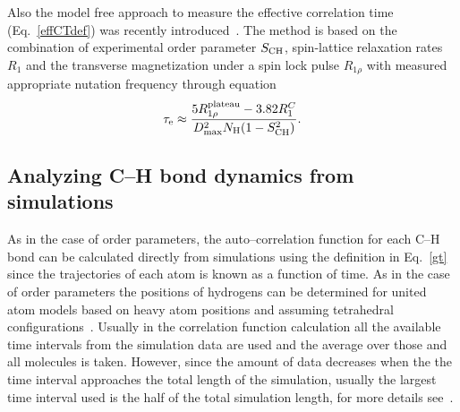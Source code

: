 \documentclass[aps,prl,superscriptaddress,twocolumn]{revtex4}
\begin{document}
Also the model free approach to measure the effective correlation time (Eq.~\ref{effCTdef}) was recently
introduced~\cite{ferreira15}. The method is based on the combination of experimental order parameter $S_{{\rm CH}}$,
spin-lattice relaxation rates $R_1$ and the transverse magnetization under a spin lock pulse $R_{1\rho}$ with measured 
appropriate nutation frequency through equation
\begin{equation}\label{ECT}
\tau_{\rm{e}}\approx\frac{5R_{1\rho}^{\rm{plateau}}-3.82R_1^C}{D_{\rm{max}}^2N_{\rm{H}}(1-S_{\rm{CH}}^2)}.
\end{equation} 



\subsection{Analyzing C--H bond dynamics from simulations}

As in the case of order parameters, the auto--correlation function for each C--H bond can be
calculated directly from simulations using the definition in Eq.~\ref{gt} since the trajectories of each atom is known
as a function of time. As in the case of order parameters the positions of hydrogens can be determined 
for united atom models based on heavy atom positions and assuming tetrahedral configurations~\cite{lindahl01,wohlert06,ferreira15}.
Usually in the correlation function calculation all the available time intervals from the 
simulation data are used and the average over those and all molecules is taken. However, since the 
amount of data decreases when the the time interval approaches the total length of the simulation,
usually the largest time interval used is the half of the total simulation length, for more details
see~\cite{gromacsMANUAL}.
\end{document}
